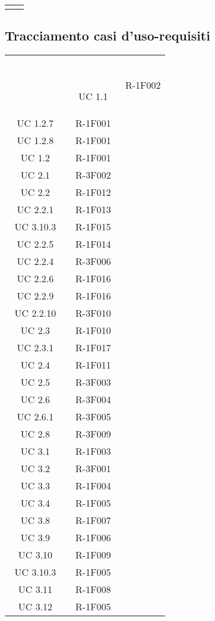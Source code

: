 \begin{tabularx}{\textwidth}{c|c}
	
	\rowcolor{white}
	\caption{Tabella tracciamento fonti-requisiti} \label{tab:tabellafonterequisiti}
\end{tabularx}


\subsection{Tracciamento casi d'uso-requisiti} 

\begin{tabularx}{\textwidth}{c|c}
	\rowcolor{greySWEight}
	\textcolor{white}{\textbf{Caso d'uso}} &
	\textcolor{white}{\textbf{Requisito}}\endhead
	
	UC 1.1 &  R-1F002  \\
	UC 1.2.7 & R-1F001 \\
	UC 1.2.8 & R-1F001  \\
	UC 1.2 &  R-1F001  \\
	UC 2.1 &  R-3F002  \\ 
	UC 2.2 &  R-1F012  \\ 
	UC 2.2.1 &  R-1F013  \\ 
	UC 3.10.3 &  R-1F015  \\ 
	UC 2.2.5 &  R-1F014  \\ 
	UC 2.2.4 &  R-3F006  \\ 
	UC 2.2.6 &  R-1F016  \\ 
	UC 2.2.9 &  R-1F016  \\ 
	UC 2.2.10 & R-3F010 \\
	UC 2.3 &  R-1F010  \\ 
	UC 2.3.1 &  R-1F017  \\ 
	UC 2.4 &  R-1F011  \\ 
	UC 2.5 &  R-3F003  \\ 
	UC 2.6 &  R-3F004  \\ 
	UC 2.6.1 &  R-3F005  \\ 
	UC 2.8 & R-3F009 \\
	UC 3.1 &  R-1F003  \\ 
	UC 3.2 &  R-3F001  \\ 
	UC 3.3 &  R-1F004  \\ 
	UC 3.4 &  R-1F005  \\ 
	UC 3.8 &  R-1F007  \\ 
	UC 3.9 &  R-1F006  \\ 
	UC 3.10 &  R-1F009  \\ 
	UC 3.10.3 &  R-1F005  \\ 
	UC 3.11 &  R-1F008  \\ 
	UC 3.12 &  R-1F005  \\ 

\end{tabularx}
